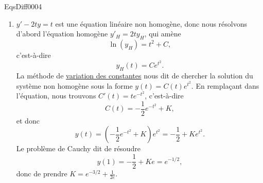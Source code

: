 
\begin{corrige}{EqsDiff0004}

\begin{enumerate}

\item
$y'-2ty=t$ est une équation linéaire non homogène, donc nous résolvons d'abord l'équation homogène $y'_H=2ty_H$, qui amène
\begin{equation}
	\ln(y_H)=t^2+C,
\end{equation}
c'est-à-dire
\begin{equation}
	y_H(t)=C e^{t^2}.
\end{equation}
La méthode de \href{http://fr.wikipedia.org/wiki/Méthode_de_variation_des_constantes}{variation des constantes} nous dit de chercher la solution du système non homogène sous la forme $y(t)=C(t) e^{t^2}$. En remplaçant dans l'équation, nous trouvons $C'(t)=t e^{-t^2}$, c'est-à-dire
\begin{equation}
	C(t)=-\frac{ 1 }{2} e^{-t^2}+K,
\end{equation}
et donc
\begin{equation}
	y(t)=(-\frac{1}{ 2 } e^{-t^2}+K) e^{t^2}=-\frac{1}{ 2 }+K e^{t^2}.
\end{equation}
Le problème de Cauchy dit de résoudre
\begin{equation}
	y(1)=-\frac{ 1 }{2}+Ke= e^{-1/2},
\end{equation}
donc de prendre $K= e^{-3/2}+\frac{1}{ 2e }$.



\end{enumerate}
\end{corrige}

